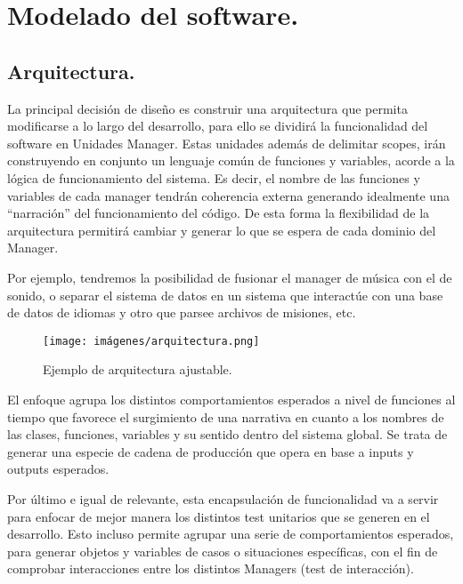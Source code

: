 
\section{Modelado del software.}\label{modelado:modelado-del-software}

\subsection{Arquitectura.}\label{modelado:arquitectura}
La principal decisión de diseño es construir una arquitectura que permita modificarse a lo largo del desarrollo, para ello se dividirá la funcionalidad del software en Unidades Manager. Estas unidades además de delimitar scopes, irán construyendo en conjunto un lenguaje común de funciones y variables, acorde a la lógica de funcionamiento del sistema. Es decir, el nombre de las funciones y variables de cada manager tendrán coherencia externa generando idealmente una “narración” del funcionamiento del código. De esta forma la flexibilidad de la arquitectura permitirá cambiar y generar lo que se espera de cada dominio del Manager.

Por ejemplo, tendremos la posibilidad de fusionar el manager de música con el de sonido, o separar el sistema de datos en un sistema que interactúe con una base de datos de idiomas y otro que parsee archivos de misiones, etc.

\begin{figure}[h]
	\centering
	\texttt{[image: imágenes/arquitectura.png]}
	\caption{Ejemplo de arquitectura ajustable.}
\end{figure}

El enfoque agrupa los distintos comportamientos esperados a nivel de funciones al tiempo que favorece el surgimiento de una narrativa en cuanto a los nombres de las clases, funciones, variables y su sentido dentro del sistema global. Se trata de generar una especie de cadena de producción que opera en base a inputs y outputs esperados.

Por último e igual de relevante, esta encapsulación de funcionalidad va a servir para enfocar de mejor manera los distintos test unitarios que se generen en el desarrollo. Esto incluso permite agrupar una serie de comportamientos esperados, para generar objetos y variables de casos o situaciones específicas, con el fin de comprobar interacciones entre los distintos Managers (test de interacción).

